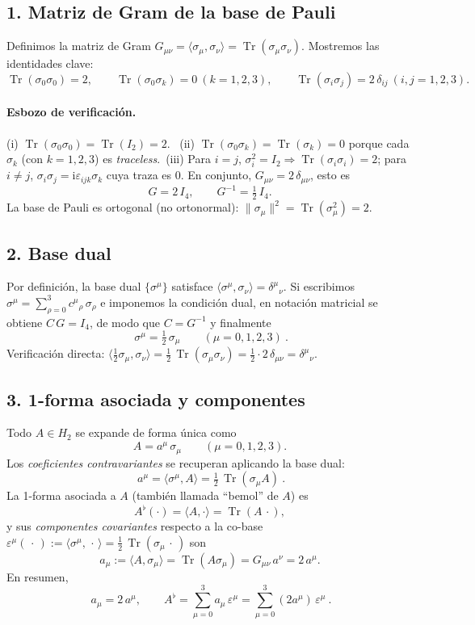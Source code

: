 \documentclass[12pt]{article}
\newcommand{\Tr}{\operatorname{Tr}}
\newcommand{\I}{\mathrm{i}} %
\begin{document}
\subsection*{1. Matriz de Gram de la base de Pauli}
Definimos la matriz de Gram $G_{\mu\nu}=\langle\sigma_\mu,\sigma_\nu\rangle=\Tr(\sigma_\mu\sigma_\nu)$.
Mostremos las identidades clave:
\[
\Tr(\sigma_0\sigma_0)=2,\qquad
\Tr(\sigma_0\sigma_k)=0\ (k=1,2,3),\qquad
\Tr(\sigma_i\sigma_j)=2\,\delta_{ij}\ (i,j=1,2,3).
\]
\paragraph{Esbozo de verificación.}
(i) $\Tr(\sigma_0\sigma_0)=\Tr(I_2)=2$. \ 
(ii) $\Tr(\sigma_0\sigma_k)=\Tr(\sigma_k)=0$ porque cada $\sigma_k$ (con $k=1,2,3$) es \emph{traceless}.\ 
(iii) Para $i=j$, $\sigma_i^2=I_2\Rightarrow \Tr(\sigma_i\sigma_i)=2$; 
para $i\neq j$, $\sigma_i\sigma_j=\I\varepsilon_{ijk}\sigma_k$ cuya traza es $0$. 
En conjunto, $G_{\mu\nu}=2\,\delta_{\mu\nu}$, esto es
\[
G=2\,I_4, \qquad G^{-1}=\tfrac12\,I_4.
\]
La base de Pauli es ortogonal (no ortonormal): $\|\sigma_\mu\|^2=\Tr(\sigma_\mu^2)=2$.

\subsection*{2. Base dual}
Por definici\'on, la base dual $\{\sigma^\mu\}$ satisface
$\langle\sigma^\mu,\sigma_\nu\rangle=\delta^\mu{}_\nu$.
Si escribimos
\(
\sigma^\mu=\sum_{\rho=0}^3 c^{\mu}{}_{\rho}\,\sigma_\rho
\)
e imponemos la condici\'on dual, en notaci\'on matricial se obtiene $C\,G=I_4$,
de modo que $C=G^{-1}$ y finalmente
\[
\boxed{\ \sigma^\mu=\tfrac12\,\sigma_\mu\qquad(\mu=0,1,2,3)\ }.
\]
Verificaci\'on directa:
\(
\langle\tfrac12\sigma_\mu,\sigma_\nu\rangle
=\tfrac12\,\Tr(\sigma_\mu\sigma_\nu)
=\tfrac12\cdot 2\,\delta_{\mu\nu}
=\delta^\mu{}_\nu.
\)

\subsection*{3. 1-forma asociada y componentes}
Todo $A\in H_2$ se expande de forma \'unica como
\[
A=a^\mu\,\sigma_\mu\qquad(\mu=0,1,2,3).
\]
Los \emph{coeficientes contravariantes} se recuperan aplicando la base dual:
\[
\boxed{\ a^\mu=\langle\sigma^\mu, A\rangle=\tfrac12\,\Tr(\sigma_\mu A)\ }.
\]
La 1-forma asociada a $A$ (también llamada “bemol” de $A$) es
\[
A^\flat(\cdot)=\langle A,\cdot\rangle=\Tr(A\,\cdot),
\]
y sus \emph{componentes covariantes} respecto a la co-base
$\varepsilon^\mu(\,\cdot\,):=\langle\sigma^\mu,\,\cdot\,\rangle
=\tfrac12\,\Tr(\sigma_\mu\,\cdot\,)$ son
\[
a_\mu:=\langle A,\sigma_\mu\rangle=\Tr(A\sigma_\mu)
=G_{\mu\nu}\,a^\nu=2\,a^\mu.
\]
En resumen,
\[
\boxed{\ a_\mu=2\,a^\mu,\qquad
A^\flat=\sum_{\mu=0}^3 a_\mu\,\varepsilon^\mu
=\sum_{\mu=0}^3 (2a^\mu)\,\varepsilon^\mu\ }.
\]
\end{document}
